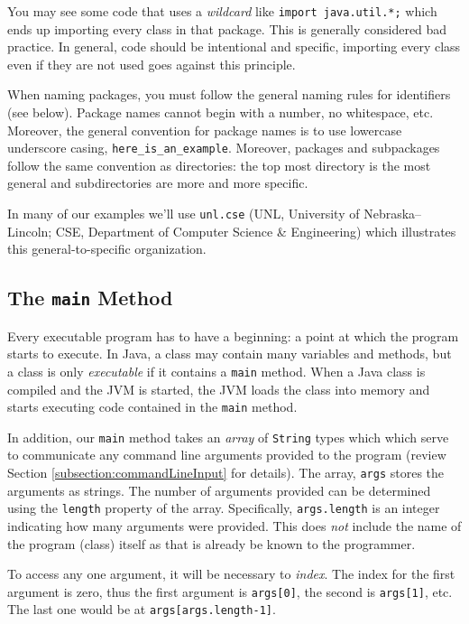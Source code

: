 You may see some code that uses a \emph{wildcard} like
\texttt{import java.util.*;} which ends up importing
every class in that package.  This is generally considered bad
practice.  In general, code should be intentional and specific, 
importing every class even if they are not used goes against
this principle. 

When naming packages, you must follow the general naming 
rules for identifiers (see below).  Package names cannot begin
with a number, no whitespace, etc.  Moreover, the general
convention for package names is to use lowercase underscore
casing, \texttt{here_is_an_example}.  Moreover, 
packages and subpackages follow the same convention as
directories: the top most directory is the most general and
subdirectories are more and more specific.  

In many of our examples we'll use \texttt{unl.cse} 
(UNL, University of Nebraska--Lincoln; CSE, Department of
Computer Science \& Engineering) which illustrates this 
general-to-specific organization.

\subsection{The \texttt{main} Method}

Every executable program has to have a beginning: a point at which the
program starts to execute.  In Java, a class may contain many variables 
and methods, but a class is only \emph{executable} if it contains a 
\texttt{main} method.  When a Java class is compiled and
the JVM is started, the JVM loads the class into memory and 
starts executing code contained in the \texttt{main} method.

In addition, our \texttt{main} method takes an \emph{array}
of \texttt{String} types which which serve to communicate
any command line arguments provided to the program (review Section
\ref{subsection:commandLineInput} for details).  The array, 
\texttt{args} stores the arguments as strings.  The number
of arguments provided can be determined using the \texttt{length}
property of the array.  Specifically, \texttt{args.length} is
an integer indicating how many arguments were provided.  This does 
\emph{not} include the name of the program (class) itself as that is
already be known to the programmer.

To access any one argument, it will be necessary to
\emph{index}.  The index for the first argument is zero, thus the
first argument is \texttt{args[0]}, the second is \texttt{args[1]}, etc.
The last one would be at \texttt{args[args.length-1]}.

